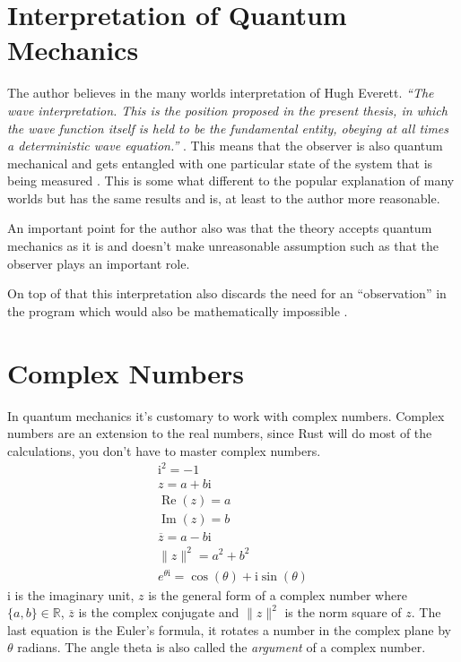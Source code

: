 \documentclass[11pt,DIV=10,final]{scrreprt} %
\newcommand{\mi}{{\text{i}}}
\newcommand{\compconj}[1]{%
  \overline{#1}%
}
\begin{document}
\section{Interpretation of Quantum Mechanics}
The author believes in the many worlds interpretation of Hugh Everett. \emph{``The wave interpretation. This is the position proposed in the present thesis, in which the wave function itself is held to be
the fundamental entity, obeying at all times a deterministic wave equation.''} \citep[p. 115]{dewitt2015many}. This means that the observer is also quantum mechanical and gets entangled with one particular
state of the system that is being measured \citep[p. 116]{dewitt2015many}. This is some what different to the popular explanation of many worlds but has the same results and is, at least to the author
more reasonable.

An important point for the author also was that the theory accepts quantum mechanics as it is and doesn't make unreasonable assumption such as that the observer plays an important role.

On top of that this interpretation also discards the need for an ``observation'' in the program which would also be mathematically impossible \citep[p. 111]{dewitt2015many}.


\section{Complex Numbers}
In quantum mechanics it's customary to work with complex numbers. Complex numbers are an extension to the real numbers, since Rust will do most of the calculations, you don't have to master complex numbers.
\begin{align*}
  \mi^{2} = -1 \\
  z = a + b \mi \\
  \operatorname{Re}(z) = a \\
  \operatorname{Im}(z) = b \\
  \compconj{z} = a - b \mi \\
  \|z\|^{2} = a^{2} + b^{2} \\
  e^{\theta \mi} = \cos(\theta) + \mi \sin(\theta)
\end{align*}
$\mi$ is the imaginary unit,
$z$ is the general form of a complex number where $\{a,b\} \in \mathbb{R}$,
$\compconj{z}$ is the complex conjugate
and $\|z\|^{2}$ is the norm square of $z$.
The last equation is the Euler's formula, it rotates a number in the complex plane by $\theta$ radians. The angle theta is also called the \emph{argument} of a complex number.
\end{document}

